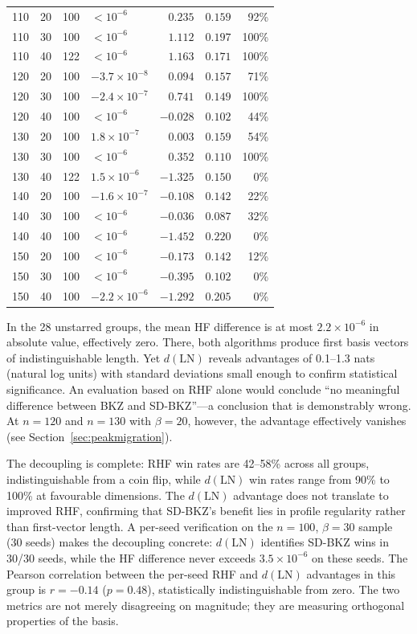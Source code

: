 \documentclass[journal=cic,version=preprint]{iacrj}
\begin{document}
\begin{table}[tbp]
\begin{tabular}{rrrlrrr}
110 & 20 & 100 & $<10^{-6}$ & $0.235$  & $0.159$ & 92\% \\
110 & 30 & 100 & $<10^{-6}$ & $1.112$  & $0.197$ & 100\% \\
110 & 40 & 122 & $<10^{-6}$ & $1.163$  & $0.171$ & 100\% \\
120 & 20 & 100 & $-3.7\times 10^{-8}$  & $0.094$  & $0.157$ & 71\% \\
120 & 30 & 100 & $-2.4\times 10^{-7}$  & $0.741$  & $0.149$ & 100\% \\
120 & 40 & 100 & $<10^{-6}$ & $-0.028$ & $0.102$ & 44\% \\
130 & 20 & 100 & $1.8\times 10^{-7}$   & $0.003$  & $0.159$ & 54\% \\
130 & 30 & 100 & $<10^{-6}$ & $0.352$  & $0.110$ & 100\% \\
130 & 40 & 122 & $1.5\times 10^{-6}$   & $-1.325$ & $0.150$ & 0\% \\
140 & 20 & 100 & $-1.6\times 10^{-7}$  & $-0.108$ & $0.142$ & 22\% \\
140 & 30 & 100 & $<10^{-6}$ & $-0.036$ & $0.087$ & 32\% \\
140 & 40 & 100 & $<10^{-6}$ & $-1.452$ & $0.220$ & 0\% \\
150 & 20 & 100 & $<10^{-6}$ & $-0.173$ & $0.142$ & 12\% \\
150 & 30 & 100 & $<10^{-6}$ & $-0.395$ & $0.102$ & 0\% \\
150 & 40 & 100 & $-2.2\times 10^{-6}$  & $-1.292$ & $0.205$ & 0\% \\
\hline
\end{tabular}
\end{table}

In the 28 unstarred groups, the mean HF difference is at most $2.2\times 10^{-6}$ in absolute value, effectively zero. There, both algorithms produce first basis vectors of indistinguishable length. Yet $d(\mathrm{LN})$ reveals advantages of 0.1--1.3 nats (natural log units) with standard deviations small enough to confirm statistical significance. An evaluation based on RHF alone would conclude ``no meaningful difference between BKZ and SD-BKZ''---a conclusion that is demonstrably wrong. At $n=120$ and $n=130$ with $\beta=20$, however, the advantage effectively vanishes (see Section~\ref{sec:peakmigration}).

The decoupling is complete: RHF win rates are 42--58\% across all groups, indistinguishable from a coin flip, while $d(\mathrm{LN})$ win rates range from 90\% to 100\% at favourable dimensions. The $d(\mathrm{LN})$ advantage does not translate to improved RHF, confirming that SD-BKZ's benefit lies in profile regularity rather than first-vector length. A per-seed verification on the $n=100$, $\beta=30$ sample (30 seeds) makes the decoupling concrete: $d(\mathrm{LN})$ identifies SD-BKZ wins in 30/30 seeds, while the HF difference never exceeds $3.5\times10^{-6}$ on these seeds. The Pearson correlation between the per-seed RHF and $d(\mathrm{LN})$ advantages in this group is $r = -0.14$ ($p = 0.48$), statistically indistinguishable from zero. The two metrics are not merely disagreeing on magnitude; they are measuring orthogonal properties of the basis.
\end{document}
